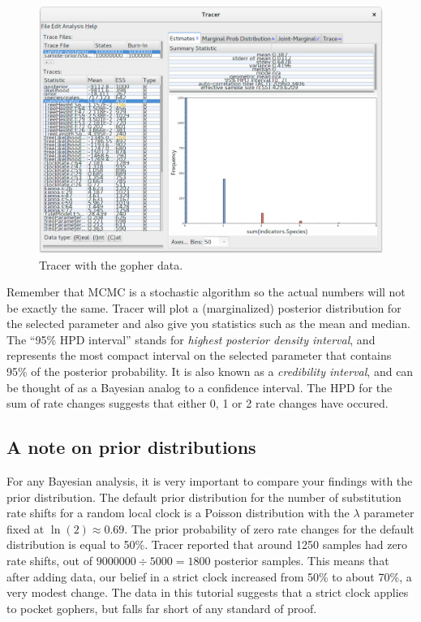 \documentclass{article}
\begin{document}
\begin{figure}[htb!]
\centering
\includegraphics[width=\textwidth]{figures/tracer-posterior.png}
\caption{Tracer with the gopher data.}
\label{fig:tracer}
\end{figure}

Remember that MCMC is a stochastic algorithm so the actual numbers will not be
exactly the same. Tracer will plot a (marginalized) posterior distribution for
the selected parameter and also give you statistics such as the mean and median.
The ``95\% HPD interval'' stands for \textit{highest posterior density
interval}, and represents the most compact interval on the selected parameter
that contains 95\% of the posterior probability. It is also known as a
\textit{credibility interval}, and can be thought of as a Bayesian analog to a
confidence interval. The HPD for the sum of rate changes suggests that either 0,
1 or 2 rate changes have occured.

\subsection*{A note on prior distributions}

For any Bayesian analysis, it is very important to compare your findings with
the prior distribution. The default prior distribution for the number of
substitution rate shifts for a random local clock is a Poisson distribution
with the $\lambda$ parameter fixed at $\ln(2) \approx 0.69$. The prior
probability of zero rate changes for the default distribution is equal to
50\%. Tracer reported that around 1250 samples had zero rate shifts,
out of $9000000 \div 5000 = 1800$ posterior samples. This means that after
adding data, our belief in a strict clock increased from 50\% to about 70\%,
a very modest change. The data in this tutorial suggests that a strict clock
applies to pocket gophers, but falls far short of any standard of proof.
\end{document}
